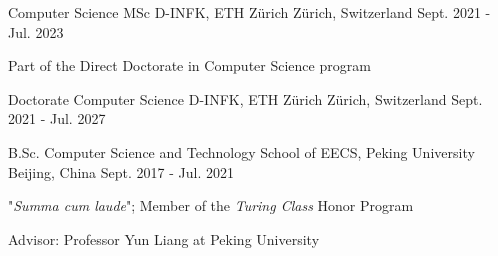 

\begin{cventries}

  \cventry
    {Computer Science MSc} %
    {D-INFK, ETH Zürich} %
    {Zürich, Switzerland} %
    {Sept. 2021 - Jul. 2023} %
    {
      \begin{cvitems} %
      \item {Part of the Direct Doctorate in Computer Science program}
      \end{cvitems}
    }

  \cventry
    {Doctorate Computer Science} %
    {D-INFK, ETH Zürich} %
    {Zürich, Switzerland} %
    {Sept. 2021 - Jul. 2027} %
    {}

  \cventry
    {B.Sc. Computer Science and Technology} %
    {School of EECS, Peking University} %
    {Beijing, China} %
    {Sept. 2017 - Jul. 2021} %
    {
      \begin{cvitems} %
      \item {"\emph{Summa cum laude}"; Member of the \emph{Turing Class} Honor Program}
      \item {Advisor: Professor Yun Liang at Peking University}
      \end{cvitems}
    }

\end{cventries}
